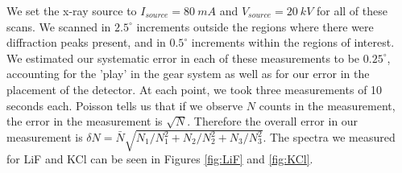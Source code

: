 \documentclass[%
 reprint,
 amsmath,amssymb,
 aps,
 pra,
]{revtex4-1}
\begin{document}
We set the x-ray source to $I_{source} = 80~mA$ and $V_{source} = 20~kV$ for all of these scans. We scanned in $2.5^\circ$ increments outside the regions where there were diffraction peaks present, and in $0.5^\circ$ increments within the regions of interest. We estimated our systematic error in each of these measurements to be $0.25^\circ$, accounting for the 'play' in the gear system as well as for our error in the placement of the detector. At each point, we took three measurements of 10 seconds each. Poisson tells us that if we observe $N$ counts in the measurement, the error in the measurement is $\sqrt{N}$. Therefore the overall error in our measurement is $\delta N =\bar{N}\sqrt{N_1/N_1^2 + N_2/N_2^2 + N_3/N_3^2}$. The spectra we measured for LiF and KCl can be seen in Figures \ref{fig:LiF} and \ref{fig:KCl}.
\end{document}
